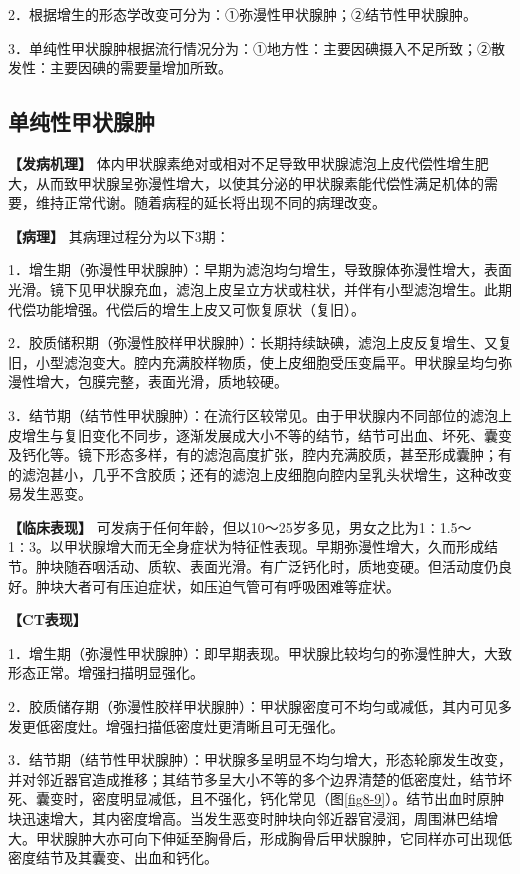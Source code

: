 2．根据增生的形态学改变可分为：①弥漫性甲状腺肿；②结节性甲状腺肿。

3．单纯性甲状腺肿根据流行情况分为：①地方性：主要因碘摄入不足所致；②散发性：主要因碘的需要量增加所致。

\subsection{单纯性甲状腺肿}

\textbf{【发病机理】}
体内甲状腺素绝对或相对不足导致甲状腺滤泡上皮代偿性增生肥大，从而致甲状腺呈弥漫性增大，以使其分泌的甲状腺素能代偿性满足机体的需要，维持正常代谢。随着病程的延长将出现不同的病理改变。

\textbf{【病理】} 其病理过程分为以下3期：

1．增生期（弥漫性甲状腺肿）：早期为滤泡均匀增生，导致腺体弥漫性增大，表面光滑。镜下见甲状腺充血，滤泡上皮呈立方状或柱状，并伴有小型滤泡增生。此期代偿功能增强。代偿后的增生上皮又可恢复原状（复旧）。

2．胶质储积期（弥漫性胶样甲状腺肿）：长期持续缺碘，滤泡上皮反复增生、又复旧，小型滤泡变大。腔内充满胶样物质，使上皮细胞受压变扁平。甲状腺呈均匀弥漫性增大，包膜完整，表面光滑，质地较硬。

3．结节期（结节性甲状腺肿）：在流行区较常见。由于甲状腺内不同部位的滤泡上皮增生与复旧变化不同步，逐渐发展成大小不等的结节，结节可出血、坏死、囊变及钙化等。镜下形态多样，有的滤泡高度扩张，腔内充满胶质，甚至形成囊肿；有的滤泡甚小，几乎不含胶质；还有的滤泡上皮细胞向腔内呈乳头状增生，这种改变易发生恶变。

\textbf{【临床表现】}
可发病于任何年龄，但以10～25岁多见，男女之比为1∶1.5～1∶3。以甲状腺增大而无全身症状为特征性表现。早期弥漫性增大，久而形成结节。肿块随吞咽活动、质软、表面光滑。有广泛钙化时，质地变硬。但活动度仍良好。肿块大者可有压迫症状，如压迫气管可有呼吸困难等症状。

\textbf{【CT表现】}

1．增生期（弥漫性甲状腺肿）：即早期表现。甲状腺比较均匀的弥漫性肿大，大致形态正常。增强扫描明显强化。

2．胶质储存期（弥漫性胶样甲状腺肿）：甲状腺密度可不均匀或减低，其内可见多发更低密度灶。增强扫描低密度灶更清晰且可无强化。

3．结节期（结节性甲状腺肿）：甲状腺多呈明显不均匀增大，形态轮廓发生改变，并对邻近器官造成推移；其结节多呈大小不等的多个边界清楚的低密度灶，结节坏死、囊变时，密度明显减低，且不强化，钙化常见（图\ref{fig8-9}）。结节出血时原肿块迅速增大，其内密度增高。当发生恶变时肿块向邻近器官浸润，周围淋巴结增大。甲状腺肿大亦可向下伸延至胸骨后，形成胸骨后甲状腺肿，它同样亦可出现低密度结节及其囊变、出血和钙化。

